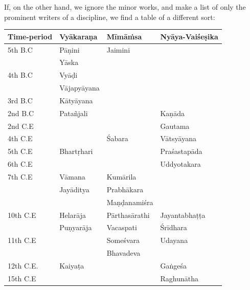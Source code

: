 If, on the other hand, we ignore the minor works, and make a list of only the prominent writers of a discipline, we find a table of a different sort: 
\begin{table}[H]
\centering
\tabcolsep=3pt
\renewcommand{\arraystretch}{1.2}
\begin{tabular}{|l|l|l|l|}
\hline
\textbf{Time-period} & \textbf{Vyākaraṇa}\index{Vyakarana@\textsl{Vyākaraṇa}} & \textbf{Mīmāṁsa}\index{Mimamsa@Mīmāṁsa} & \textbf{Nyāya-Vaiśeṣika}\index{Nyayavaisesika@Nyāya-Vaiśeṣika}\\\hline
5th B.C & Pāṇini\index{Panini@Pāṇini} & Jaimini\index{Jaimini}  & \\\hline
& Yāska\index{Yaska@Yāska} & & \\\hline
4th B.C & Vyāḍi\index{Vyadi@Vyāḍi} & & \\\hline
& Vājapyāyana\index{Vajapyayana@Vājapyāyana} & & \\\hline
3rd B.C & Kātyāyana\index{Katyayana@Kātyāyana} & & \\\hline
2nd B.C & Patañjali\index{Patanjali@Patañjali} & & Kaṇāda\index{Kanada@Kaṇāda}\\\hline
2nd C.E & & & Gautama\index{Gautama}\\\hline
4th C.E & & Śabara\index{Sabara@Śabara} & Vātsyāyana\index{Vatsyayana@Vātsyāyana}\\\hline
5th C.E & Bhartṛhari\index{Bhartrhari@Bhartṛhari} & & Praśastapāda\index{Prasastapada@Praśastapāda}\\\hline
6th C.E& & & Uddyotakara\\\hline
7th C.E & Vāmana\index{Vamana@Vāmana} & Kumārila\index{Kumarilabhatta@Kumārilabhaṭṭa} & \\\hline
& Jayāditya\index{Jayaditya@Jayāditya} & Prabhākara\index{Prabhakara@Prabhākara} & \\\hline
& & Maṇḍanamiśra\index{Mandanamisra@Maṇḍanamiśra} & \\\hline
10th C.E & Helarāja\index{Helaraja@Helarāja} & Pārthasārathi & Jayantabhaṭṭa\index{Jayantabhatta@Jayantabhaṭṭa}\\\hline
 & Puṇyarāja\index{Punyaraja@Puṇyarāja} & Vacaspati\index{Vacaspatimisra@Vācaspati Miśra} & Śrīdhara\\\hline
11th C.E & & Someśvara & Udayana\index{Udayana}\\\hline
& & Bhavadeva & \\\hline
12th C.E. & Kaiyaṭa\index{Kaiyata@Kaiyaṭa} & & Gaṅgeśa\index{Gangesa@Gaṅgeśa}\\\hline
15th C.E & & & Raghunātha\\\hline

\end{tabular}
\end{table}
